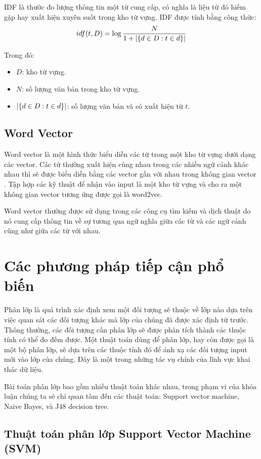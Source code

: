 IDF là thước đo lượng thông tin một từ cung cấp, có nghĩa là liệu từ đó hiếm gặp hay xuất hiện xuyên suốt trong kho từ vựng. IDF được tính bằng công thức:
\begin{equation}
  idf(t, D) = \log\frac{N}{1 + \abs{\{d \in D: t \in d\}}}
\end{equation}

Trong đó:
\begin{itemize}
  \item $D$: kho từ vựng.
  \item $N$: số lượng văn bản trong kho từ vựng.
  \item $\abs{\{d \in D: t \in d \}}$: số lượng văn bản và có xuất hiện từ $t$. 
\end{itemize}
	\subsection*{Word Vector}
Word vector là một hình thức biểu diễn các từ trong một kho từ vựng dưới dạng các vector. Các từ thường xuất hiện cùng nhau trong các nhiều ngữ cảnh khác nhau thì sẽ được biểu diễn bằng các vector gần với nhau trong không gian vector \cite{mikolov:word2vec}. Tập hợp các kỹ thuật để nhận vào input là một kho từ vựng và cho ra một không gian vector tương ứng được gọi là word2vec.

  Word vector thường được sử dụng trong các công cụ tìm kiếm và dịch thuật do nó cung cấp thông tin về sự tương qua ngữ nghĩa giữa các từ và các ngữ cảnh cũng như giữa các từ với nhau.

\section{Các phương pháp tiếp cận phổ biến}
Phân lớp là quá trình xác định xem một đối tượng sẽ thuộc về lớp nào dựa trên việc quan sát các đối tượng khác mà lớp của chúng đã được xác định từ trước. Thông thường, các đối tượng cần phân lớp sẽ được phân tích thành các thuộc tính có thể đo đếm được. Một thuật toán dùng để phân lớp, hay còn được gọi là một bộ phân lớp, sẽ dựa trên các thuộc tính đó để ánh xạ các đối tượng input mới vào lớp của chúng. Đây là một trong những tác vụ chính của lĩnh vực khai thác dữ liệu.

Bài toán phân lớp bao gồm nhiều thuật toán khác nhau, trong phạm vi của khóa luận chúng ta sẽ chỉ quan tâm đến các thuật toán: Support vector machine, Naive Bayes, và J48 decision tree.
\subsection{Thuật toán phân lớp Support Vector Machine (SVM)}
